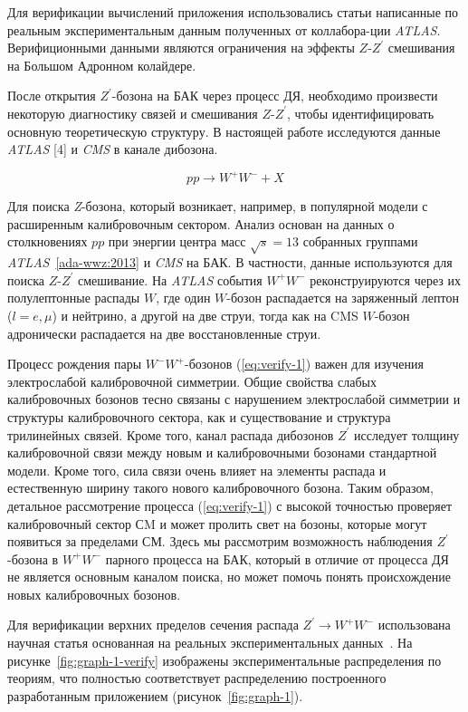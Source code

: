 Для верификации вычислений приложения использовались статьи написанные по реальным экспериментальным данным полученных от коллабора-ции \textit{ATLAS}. Верифиционными данными являются ограничения на эффекты $Z$-${Z}^{\prime}$ смешивания на Большом Адронном колайдере.

После открытия $Z^\prime$-бозона на БАК через процесс ДЯ, необходимо произвести некоторую диагностику связей и смешивания $Z$-$Z^\prime$, чтобы идентифицировать основную теоретическую структуру. В настоящей работе исследуются данные \textit{ATLAS} [4] и \textit{CMS} в канале дибозона.

\begin{equation} \label{eq:verify-1}
pp \rightarrow W^+W^- + X
\end{equation}

Для поиска \textit{Z}-бозона, который возникает, например, в популярной модели с расширенным калибровочным сектором. Анализ основан на данных о столкновениях $pp$ при энергии центра масс $\sqrt{s} = 13 $ собранных группами \textit{ATLAS}~\ref{ada-wwz:2013} и \textit{CMS} на БАК. В частности, данные используются для поиска $Z$-$Z^\prime$ смешивание. На \textit{ATLAS} события $W^+W^-$ реконструируются через их полулептонные распады $W$, где один $W$-бозон распадается на заряженный лептон ($l=e,\mu$) и нейтрино, а другой на две струи, тогда как на CMS $W$-бозон адронически распадается на две восстановленные струи. 

Процесс рождения пары $W^-W^+$-бозонов (\ref{eq:verify-1}) важен для изучения электрослабой калибровочной симметрии. Общие свойства слабых калибровочных бозонов тесно связаны с нарушением электрослабой симметрии и структуры калибровочного сектора, как и существование и структура трилинейных связей. Кроме того, канал распада дибозонов $Z^\prime$ исследует толщину калибровочной связи между новым и калибровочными бозонами стандартной модели. Кроме того, сила связи очень влияет на элементы распада и естественную ширину такого нового калибровочного бозона. Таким образом, детальное рассмотрение процесса (\ref{eq:verify-1}) с высокой точностью проверяет калибровочный сектор СM и может пролить свет на бозоны, которые могут появиться за пределами СМ. Здесь мы рассмотрим возможность наблюдения $Z^\prime$-бозона в $W^+W^-$ парного процесса на БАК, который в отличие от процесса ДЯ не является основным каналом поиска, но может помочь понять происхождение новых калибровочных бозонов.

Для верификации верхних пределов сечения распада ${Z}^{\prime} \rightarrow {W}^{+}{W}^{-} $ использована научная статья основанная на реальных экспериментальных данных~\cite{2part-pankov}. На рисунке~\ref{fig:graph-1-verify} изображены экспериментальные распределения по теориям, что полностью соответствует распределению построенного разработанным приложением (рисунок~\ref{fig:graph-1}).

